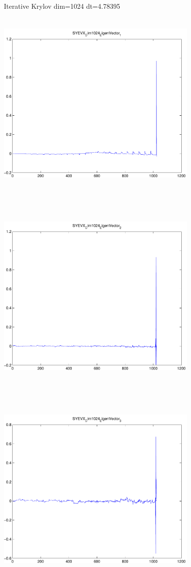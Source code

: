\documentclass[9pt]{article}
\theoremstyle{plain}
\theoremstyle{definition}
\theoremstyle{remark}
\numberwithin{equation}{section}
\begin{document}
Iterative Krylov dim=1024 dt=4.78395
\includegraphics[width=10.0cm,height=10.0cm]{SYEVX_Dim1024_EigenVector_1.pdf}

\includegraphics[width=10.0cm,height=10.0cm]{SYEVX_Dim1024_EigenVector_2.pdf}

\includegraphics[width=10.0cm,height=10.0cm]{SYEVX_Dim1024_EigenVector_3.pdf}
\end{document}
